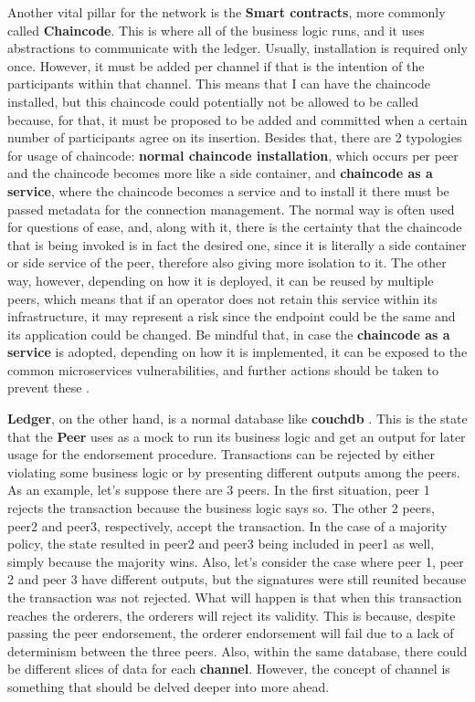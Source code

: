Another vital pillar for the network is the \textbf{Smart contracts}, more commonly called \textbf{Chaincode}. This is where all of the 
business logic runs, and it uses abstractions to communicate with the ledger. Usually, installation is required only once. However, it 
must be added per channel if that is the intention of the participants within that channel. This means that I can have the chaincode 
installed, but this chaincode could potentially not be allowed to be called because, for that, it must be proposed to be added and 
committed when a certain number of participants agree on its insertion. Besides that, there are 2 typologies for usage of 
chaincode: \textbf{normal chaincode installation}, which occurs per peer and the chaincode becomes more like a side 
container, and \textbf{chaincode as a service}, where the chaincode becomes a service and to install it there must be passed metadata 
for the connection management. The normal way is often used for questions of ease, and, along with it, there is the certainty that 
the chaincode that is being invoked is in fact the desired one, since it is literally a side container or side service of the peer, 
therefore also giving more isolation to it. The other way, however, depending on how it is deployed, it can be reused by 
multiple peers, which means that if an operator does not retain this service within its infrastructure, it may represent a 
risk since the endpoint could be the same and its application could be changed. Be mindful that, in case 
the \textbf{chaincode as a service} is adopted, depending on how it is implemented, it can be exposed to the common microservices 
vulnerabilities, and further actions should be taken to prevent these \cite{microservices-common-vulnerabilities}.

\textbf{Ledger}, on the other hand, is a normal database like \textbf{couchdb} \cite{couchdb}. This is the state that the 
\textbf{Peer} uses as a mock to run its business logic and get an output for later usage for the endorsement procedure. Transactions 
can be rejected by either violating some business logic or by presenting different outputs among the peers. As an example, let's suppose 
there are 3 peers. In the first situation, peer 1 rejects the transaction because the business logic says so. The other 2 peers, peer2 and 
peer3, respectively, accept the transaction. In the case of a majority policy, the state resulted in peer2 and peer3 being included 
in peer1 as well, simply because the majority wins. Also, let's consider the case where peer 1, peer 2 and peer 3 have different outputs, 
but the signatures were still reunited because the transaction was not rejected. What will happen is that when this transaction reaches the 
orderers, the orderers will reject its validity. This is because, despite passing the peer endorsement, the orderer endorsement will fail due 
to a lack of determinism between the three peers. Also, within the same database, there could be different slices of data for 
each \textbf{channel}. However, the concept of channel is something that should be delved deeper into more ahead.


